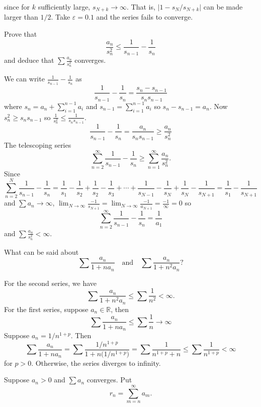 \begin{exercise}
\begin{exercise}[label = (\alph*), ref = \arabic{exercisei} (\alph*)]
\[    \]
    since for \(k\) sufficiently large, \(s_{N + k}\to\infty\).
    That is, \(\lvert 1 - s_N/s_{N + k}\rvert\) can be made larger than
    \(1/2\).
    Take \(\varepsilon = 0.1\) and the series fails to converge.
  \item
    Prove that
    \[
    \frac{a_n}{s_n^2}\leq\frac{1}{s_{n - 1}} - \frac{1}{s_n}
    \]
    and deduce that \(\sum\frac{a_n}{s_n^2}\) converges.
    \par\smallskip
    We can write \(\frac{1}{s_{n - 1}} - \frac{1}{s_n}\) as
    \[
    \frac{1}{s_{n - 1}} - \frac{1}{s_n} = \frac{s_n - s_{n - 1}}{s_ns_{n - 1}}
    \]
    where \(s_n = a_n + \sum_{i = 1}^{n - 1}a_i\) and
    \(s_{n - 1} = \sum_{i = 1}^{n - 1}a_i\) so \(s_n - s_{n - 1} = a_n\).
    Now \(s_n^2\geq s_ns_{n - 1}\) so
    \(\frac{1}{s_n^2}\leq\frac{1}{s_ns_{n - 1}}\).
    \[
    \frac{1}{s_{n - 1}} - \frac{1}{s_n} = \frac{a_n}{s_ns_{n - 1}}\geq
    \frac{a_n}{s_n^2}
    \]
    The telescoping series
    \[
    \sum_{n = 2}^{\infty}\frac{1}{s_{n - 1}} - \frac{1}{s_n}\geq
    \sum_{n = 1}^{\infty}\frac{a_n}{s_n^2}.
    \]
    Since
    \[
    \sum_{n = 2}^N\frac{1}{s_{n - 1}} - \frac{1}{s_n} =
    \frac{1}{s_1} - \frac{1}{s_2} + \frac{1}{s_2} - \frac{1}{s_3} + \cdots +
    \frac{1}{s_{N - 1}} - \frac{1}{s_N} + \frac{1}{s_N} - \frac{1}{s_{N + 1}}
    = \frac{1}{s_1} - \frac{1}{s_{N + 1}}
    \]
    and \(\sum a_n\to\infty\), \(\lim_{N\to\infty}\frac{-1}{s_{N + 1}} =
    \lim_{N\to\infty}\frac{-1}{a_{N + 1}} = \frac{-1}{\infty} = 0\) so
    \[
    \sum_{n = 2}^{\infty}\frac{1}{s_{n - 1}} - \frac{1}{s_n} = \frac{1}{a_1}
    \]
    and \(\sum\frac{a_n}{s_n^2} < \infty\).
  \item
    What can be said about
    \[
    \sum\frac{a_n}{1 + na_n}\quad\text{and}\quad\sum\frac{a_n}{1 + n^2a_n}
    \mbox{?}
    \]
    \par\smallskip
    For the second series, we have
    \[
    \sum\frac{a_n}{1 + n^2a_n}\leq\sum\frac{1}{n^2} < \infty.
    \]
    For the first series, suppose \(a_n\in\mathbb{R}\), then
    \[
    \sum\frac{a_n}{1 + na_n}\leq\sum\frac{1}{n}\to\infty
    \]
    Suppose \(a_n = 1/n^{1 + p}\).
    Then
    \[
    \sum\frac{a_n}{1 + na_n} =
    \sum\frac{1/n^{1 + p}}{1 + n\bigl(1/n^{1 + p}\bigr)} =
    \sum\frac{1}{n^{1 + p} + n}\leq\sum\frac{1}{n^{1 + p}} < \infty
    \]
    for \(p > 0\).
    Otherwise, the series diverges to infinity.
  \end{exercise}
\item
  Suppose \(a_n > 0\) and \(\sum a_n\) converges.
  Put
  \[
  r_n = \sum_{m = n}^{\infty}a_m.
\]
\end{exercise}
